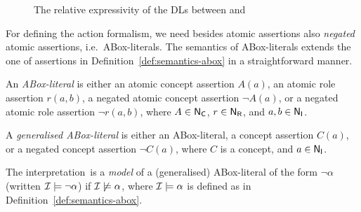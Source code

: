 \begin{figure}[t]
    \centering
    \caption{The relative expressivity of the DLs between \ALC and~\ALCQIO}
    \label{fig:alc-alcqio}
\end{figure}

For defining the action formalism, we need besides atomic assertions also
\emph{negated} atomic assertions, i.e.~ABox-literals.  The semantics of
ABox-literals extends the one of assertions in
Definition~\ref{def:semantics-abox} in a straightforward manner.

\begin{definition}
    An \emph{ABox-literal} is either an atomic concept assertion $A(a)$, an
    atomic role assertion $r(a,b)$, a negated atomic concept assertion $\lnot
    A(a)$, or a negated atomic role assertion $\lnot r(a,b)$, where $A\in\mathsf{N_C}$,
    $r\in\mathsf{N_R}$, and $a,b\in\mathsf{N_I}$.

    A \emph{generalised ABox-literal} is either an ABox-literal, a concept
    assertion $C(a)$, or a negated concept assertion $\lnot C(a)$, where $C$ is
    a concept, and $a\in\mathsf{N_I}$.

    The interpretation~\Imc is a \emph{model} of a (generalised) ABox-literal of
    the form $\lnot\alpha$ (written $\mathcal{I}\models\lnot\alpha$) if
    $\mathcal{I}\not\models\alpha$, where $\mathcal{I}\models\alpha$ is defined as in
    Definition~\ref{def:semantics-abox}.
\end{definition}

